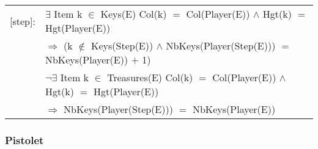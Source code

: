 \documentclass[8pt]{article}
\begin{document}
{\begin{longtable}{rl}
    \textrm{[step]}:& $\exists$ \textrm{Item} k $\in$ \textrm{Keys(E)} \textrm{Col(k)} $=$ \textrm{Col(Player(E))} $\land$ \textrm{Hgt(k)} $=$ \textrm{Hgt(Player(E))}\\
  & \quad\quad $\Rightarrow$ (k $\notin$ Keys(Step(E)) $\land$ \textrm{NbKeys(Player(Step(E)))} $=$ \textrm{NbKeys(Player(E))} $+$ 1)\\
  & $\neg$$\exists$ \textrm{Item} k $\in$ \textrm{Treasures(E)} \textrm{Col(k)} $=$ \textrm{Col(Player(E))} $\land$ \textrm{Hgt(k)} $=$ \textrm{Hgt(Player(E))}\\
  & \quad\quad $\Rightarrow$ \textrm{NbKeys(Player(Step(E)))} $=$ \textrm{NbKeys(Player(E))}\\
  \end{longtable}}

\subsubsection{Pistolet}
\end{document}
